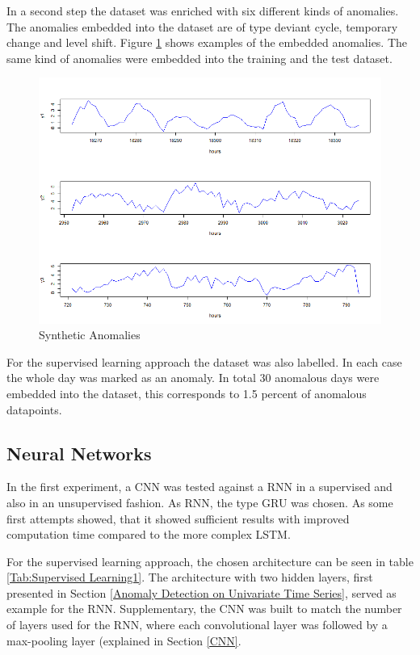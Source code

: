 In a second step the dataset was enriched with six different kinds of anomalies. The anomalies embedded into the dataset are of type deviant cycle, temporary change and level shift. Figure \ref{fig:anomalies} shows examples of the embedded anomalies. The same kind of anomalies were embedded into the training and the test dataset.

\begin{figure}[h]
	\centering
	\includegraphics[scale=0.7]{Figures/Anomalies}
	\decoRule
	\caption[Synthetic Anomalies]{Synthetic Anomalies \parencite{own}}
	\label{fig:anomalies}
\end{figure}

For the supervised learning approach the dataset was also labelled. In each case the whole day was marked as an anomaly. In total 30 anomalous days were embedded into the dataset, this corresponds to 1.5 percent of anomalous datapoints.

\subsection{Neural Networks}
In the first experiment, a CNN was tested against a RNN in a supervised and also in an unsupervised fashion. As RNN, the type GRU was chosen. As some first attempts showed, that it showed sufficient results with improved computation time compared to the more complex LSTM. 

For the supervised learning approach, the chosen architecture can be seen in table \ref{Tab:Supervised Learning1}. The architecture with two hidden layers, first presented in Section \ref{Anomaly Detection on Univariate Time Series}, served as example for the RNN. Supplementary, the CNN was built to match the number of layers used for the RNN, where each convolutional layer was followed by a max-pooling layer (explained in Section \ref{CNN}.     

